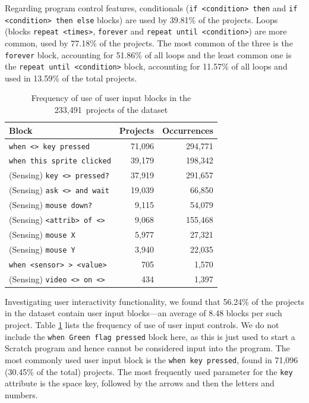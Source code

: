 \documentclass{sig-alternate-05-2015}
\newcommand{\nScriptPrograms}{233,491}
\begin{document}
Regarding program control features, conditionals (\texttt{if <condition> then} and \texttt{if <condition> then else} blocks) are used by 39.81\% of the projects. Loops (blocks \texttt{repeat <tim\-es>}, \texttt{forever} and \texttt{repeat until <condition>}) are more common, used by 77.18\% of the projects. The most common of the three is the \texttt{forever} block, accounting for 51.86\% of all loops and the least common one is the \texttt{repeat until <condition>} block, accounting for 11.57\% of all loops and used in 13.59\% of the total projects.

\begin{table}
	\centering
	\begin{tabular}{lrr}
		\hline
		\textbf{Block}&\textbf{Projects}&\textbf{Occurrences}\\
		\hline
		\texttt{when <> key pressed}&71,096&294,771\\
		\texttt{when this sprite clicked}&39,179&198,342\\
		(Sensing) \texttt{key <> pressed?}&37,919&291,657\\
		(Sensing) \texttt{ask <> and wait}&19,039&66,850\\
		(Sensing) \texttt{mouse down?}&9,115&54,079\\
		(Sensing) \texttt{<attrib> of <>}&9,068&155,468\\
		(Sensing) \texttt{mouse X}&5,977&27,321\\
		(Sensing) \texttt{mouse Y}&3,940&22,035\\
		\texttt{when <sensor> > <value>}&705&1,570\\
		(Sensing) \texttt{video <> on <>}&434&1,397\\
		\hline
	\end{tabular}
	\caption{Frequency of use of user input blocks in the \nScriptPrograms~projects of the dataset}
	\label{tbl-userinput}
\end{table}
	
Investigating user interactivity functionality, we found that 56.24\% of the projects in the dataset contain user input blocks---an average of 8.48 blocks per such project. Table \ref{tbl-userinput} lists the frequency of use of user input controls. We do not include the \texttt{when Green flag pressed} block here, as this is just used to start a Scratch program and hence cannot be considered input into the program. The most commonly used user input block is the \texttt{when key pressed}, found in 71,096 (30.45\% of the total) projects. The most frequently used parameter for the \texttt{key} attribute is the space key, followed by the arrows and then the letters and numbers.
\end{document}
